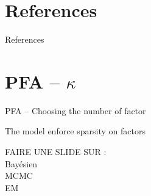 \documentclass[10pt,xcolor=x11names,compress, notes=show]{beamer}%
\begin{document}
\section*{References}

\begin{frame}{References}
		\setlength{\bibsep}{2em}
		
		
\end{frame}

\section*{PFA -- $\kappa$}
\begin{frame}{PFA -- Choosing the number of factor}
	\centering
	
	The model enforce sparsity on factors\\
	
	

\end{frame}

\begin{frame}
	FAIRE UNE SLIDE SUR : \\
	Bayésien\\
	MCMC\\
	EM
\end{frame}

\setcounter{framenumber}{\value{finalframe}}




% 
% 
\end{document}
